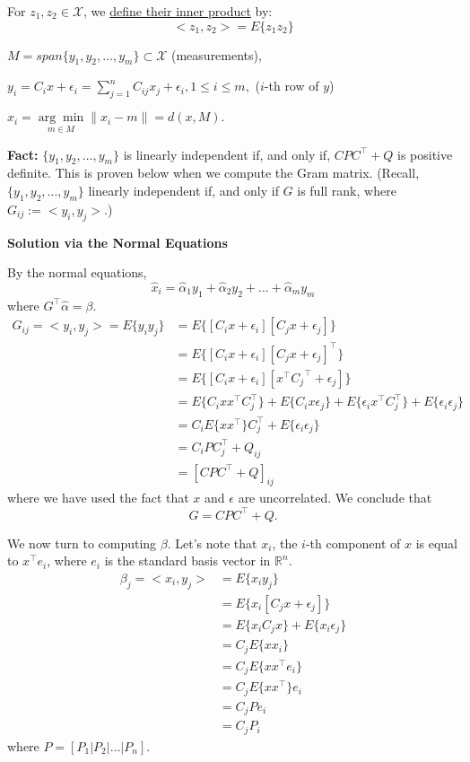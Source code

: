 \documentclass[letterpaper]{article}
\newcommand{\real}{\mathbb R}  %
\begin{document}
For $z_1,z_2 \in \mathcal{X}$, we \underline{define their inner product} by:  $$<z_1,z_2> = E\{z_1z_2\}$$

$M = span\{y_1,y_2,\dots,y_m\} \subset \mathcal{X}$ (measurements),

$y_i = C_ix+\epsilon_i = \sum\limits_{j=1}^n C_{ij}x_j+\epsilon_i, 1\le i \le m,$  ($i$-th row of $y$)

$\hat{x}_i = \underset{m \in M}{\arg\min} \|x_i-m\|=d(x,M).$

\textbf{Fact:} $\{y_1,y_2,\dots,y_m\}$ is linearly independent if, and only if, $CPC^\top +Q$ is positive definite. This is proven below when we compute the Gram matrix. (Recall, $\{y_1,y_2,\dots,y_m\}$ linearly independent if, and only if $G$ is full rank, where $G_{ij}:=<y_i,y_j>.$)

\newpage
\centerline{\bf Solution via the Normal Equations}


By the normal equations,
$$\hat{x}_i = \hat \alpha_1 y_1  +  \hat \alpha_2 y_2  + \dots + \hat \alpha_m y_m$$
where $G^\top \hat \alpha = \beta$.
\begin{align*}
G_{ij} = <y_i,y_j> = E\{y_i y_j\} &= E\{[C_i x+\epsilon_i][C_j x+\epsilon_j]\}\\
& = E\{[C_i x+\epsilon_i][C_j x+\epsilon_j]^\top \}\\
& = E\{[C_i x+\epsilon_i][x^\top  {C_j}^\top  +\epsilon_j]\}\\
& = E\{C_i xx^\top  C_j^\top \} + E\{C_i x\epsilon_j\} + E\{\epsilon_i x^\top  C_j^\top \} + E\{ \epsilon_i \epsilon_j\}\\
& = C_iE\{ xx^\top  \}C_j^\top  + E\{ \epsilon_i \epsilon_j\}\\
& = C_i P C_j^\top  + Q_{ij}\\
&=[CPC^\top +Q]_{ij}\
\end{align*}
where we have used the fact that $x$ and $\epsilon$ are uncorrelated. We conclude that
$$G = CPC^\top +Q.$$

We now turn to computing $\beta$. Let's note that $x_i$, the $i$-th component of $x$ is equal to $x^\top  e_i$, where $e_i$ is the standard basis vector in $\real^n$.
\begin{align*}
\beta_j = <x_i,y_j> &= E\{x_i y_j\}\\
 &= E\{x_i[C_j x+\epsilon_j]\} \\
 &= E\{x_i C_j x\} + E\{x_i \epsilon_j\} \\
 & = C_jE\{ x x_i\} \\
  & = C_jE\{ x x^\top  e_i\} \\
    & = C_jE\{ x x^\top  \} e_i\\
 &= C_j P e_i \\
 &= C_j P_i
\end{align*}
where $P=[P_1 | P_2| \dots | P_n]$.
\end{document}
